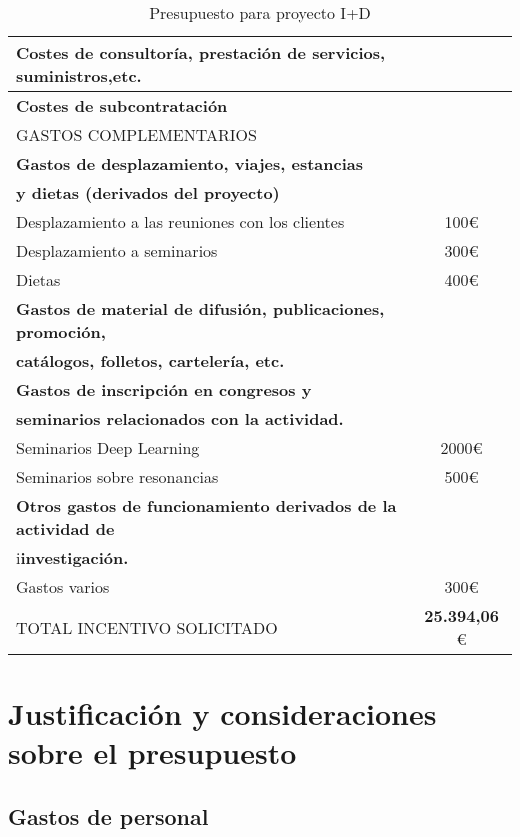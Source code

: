 \begin{table}[H]
\begin{center}
\begin{tabular}{|l|c|}
		\cellcolor[gray]{0.8}\textbf{Costes de consultoría, prestación de servicios, suministros,etc.} &  \\ \hline
		\cellcolor[gray]{0.8}\textbf{Costes de subcontratación} &  \\ \hline
		\cellcolor[gray]{0.5}GASTOS COMPLEMENTARIOS &  \\ \hline
		\cellcolor[gray]{0.8}\textbf{Gastos de desplazamiento, viajes, estancias}    \\ 
		\cellcolor[gray]{0.8}\textbf{y dietas (derivados del proyecto)} &  \\ \hline
		Desplazamiento a las reuniones con los clientes & 100\euro \\ \hline
		Desplazamiento a seminarios & 300\euro \\ \hline
		Dietas &  400\euro \\ \hline
		\cellcolor[gray]{0.8}\textbf{Gastos de material de difusión, publicaciones, promoción,}   \\ 
		\cellcolor[gray]{0.8}\textbf{catálogos, folletos, cartelería, etc.} &  \\ \hline
		\cellcolor[gray]{0.8}\textbf{Gastos de inscripción en congresos y} \\
		\cellcolor[gray]{0.8}\textbf{seminarios relacionados con la actividad.} &  \\ \hline
		Seminarios Deep Learning &  2000\euro \\ \hline
		Seminarios sobre resonancias & 500\euro  \\ \hline
		\cellcolor[gray]{0.8}\textbf{Otros gastos de funcionamiento derivados de la actividad de} \\
		i\cellcolor[gray]{0.8}\textbf{investigación.} &  \\ \hline
		Gastos varios & 300\euro \\ \hline
		\cellcolor{red}TOTAL INCENTIVO SOLICITADO & \textbf{25.394,06} \euro \\ \hline
		\end{tabular}
	\end{center}
	\caption{Presupuesto para proyecto I+D}
	\label{tab:tabla1}
\end{table}

\section{Justificación y consideraciones sobre el presupuesto}

\subsection{Gastos de personal}

